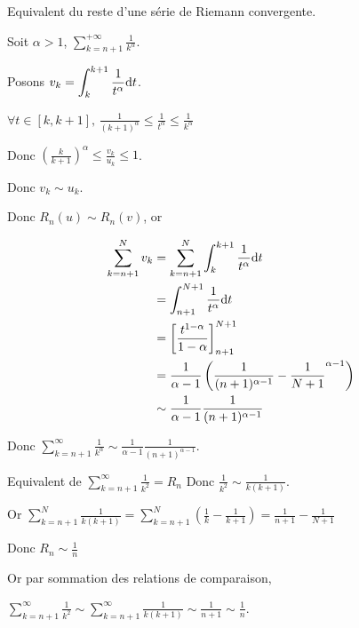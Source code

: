 \begin{exemple}
    Equivalent du reste d'une série de Riemann convergente. 

    Soit $\alpha > 1$, $\displaystyle \sum_{k = n + 1}^{+ \infty } \frac 1 {k^\alpha}$.

    Posons $\displaystyle v_k = \int_k^{k + 1} \frac 1 {t^\alpha} \text d t$. 

    $\displaystyle \forall t \in [k, k + 1], \, \frac 1 {(k + 1)^\alpha} \leqslant \frac 1 {t^\alpha} \leqslant \frac 1 {k^\alpha}$

    Donc $\displaystyle \left( \frac k {k +  1} \right)^\alpha \leqslant \frac {v_k}{u_k} \leqslant 1$.

    Donc $v_k \sim u_k$.

    Donc $R_n(u) \sim R_n(v)$, or 

    \begin{align*}
        \sum_{k = n + 1 }^{N } v_k & = \sum_{k = n + 1}^{N } \int_k^{k + 1} \frac 1 {t^\alpha} \text d t \\
                                            & = \int_{n + 1}^{N + 1} \frac 1 {t^\alpha} \text d t \\
                                            & = \left[ \frac{t^{1 - \alpha}}{1 - \alpha} \right]_{n + 1}^{N + 1} \\
                                            & = \frac 1 {\alpha - 1} \left( \frac 1 {(n + 1)^{\alpha - 1}} - \frac 1 {N + 1}^{\alpha - 1} \right) \\
                                            & \sim \frac 1 {\alpha - 1} \frac 1 {(n + 1)^{\alpha - 1}} 
    \end{align*}

    Donc $\displaystyle \sum_{k = n + 1}^{\infty} \frac 1 {k^\alpha} \sim \frac 1 {\alpha - 1} \frac 1 {(n + 1)^{\alpha - 1}}$.
    
    

    \svspace Equivalent de $\displaystyle \sum_{k = n + 1}^{\infty } \frac 1 {k^2} = R_n$
    Donc $\displaystyle \frac 1 {k^2} \sim \frac 1 {k(k + 1)}$.

    Or $\displaystyle \sum_{k = n + 1}^{N} \frac 1 {k(k + 1)} = \sum_{k = n + 1}^{N } \left( \frac 1 k - \frac 1 {k + 1} \right) = \frac 1 {n + 1} - \frac 1 {N + 1}$

    Donc $\displaystyle R_n \sim \frac 1 n$

    Or par sommation des relations de comparaison, 
    
    $\displaystyle \sum_{k = n + 1}^{\infty } \frac 1 {k^2} \sim \sum_{k = n + 1}^{\infty } \frac 1 {k(k + 1)} \sim \frac 1 {n + 1} \sim \frac 1 n$.

\end{exemple}
